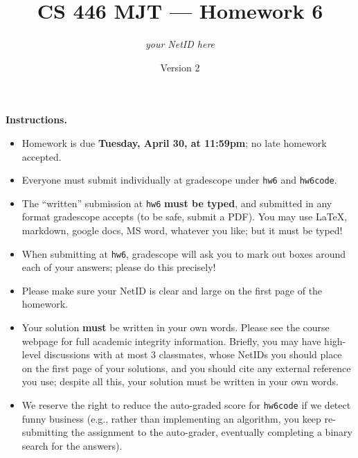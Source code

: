 \documentclass{article}
\title{CS 446 MJT --- Homework 6}
\author{\emph{your NetID here}}
\date{Version 2}
\theoremstyle{definition}
\theoremstyle{remark}
\begin{document}
                \maketitle

                \textbf{Instructions.}
                \begin{itemize}
                    \item
                        Homework is due \textbf{Tuesday, April 30, at 11:59pm}; no late homework accepted.

                    \item
                        Everyone must submit individually at gradescope under \texttt{hw6} and \texttt{hw6code}.


                    \item
                        The ``written'' submission at \texttt{hw6} \textbf{must be typed}, and submitted in
                        any format gradescope accepts (to be safe, submit a PDF).  You may use \LaTeX, markdown,
                        google docs, MS word, whatever you like; but it must be typed!


                    \item
                        When submitting at \texttt{hw6}, gradescope will ask you to mark out boxes
                        around each of your answers; please do this precisely!

                    \item
                        Please make sure your NetID is clear and large on the first page of the homework.

                    \item
                        Your solution \textbf{must} be written in your own words.
                        Please see the course webpage for full academic integrity information.
                        Briefly, you may have high-level discussions with at most 3 classmates,
                        whose NetIDs you should place on the first page of your solutions,
                        and you should cite any external reference you use; despite all this,
                        your solution must be written in your own words.

                    \item
                        We reserve the right to reduce the auto-graded score for \texttt{hw6code}
                        if we detect funny business (e.g., rather than implementing an algorithm,
                        you keep re-submitting the assignment to the auto-grader, eventually completing
                        a binary search for the answers).


\end{itemize}
\end{document}
